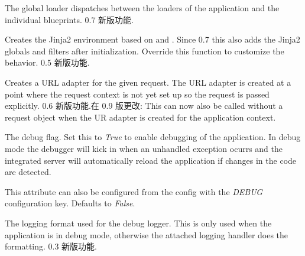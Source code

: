 \documentclass[a4paper,12pt]{sphinxmanual}
\begin{document}
\begin{fulllineitems}
\begin{fulllineitems}
The global loader dispatches between the loaders of the application
and the individual blueprints.
0.7 新版功能.
\end{fulllineitems}


\begin{fulllineitems}
\label{api:flask.Flask.create_jinja_environment}
Creates the Jinja2 environment based on {\hyperref[api:flask.Flask.jinja_options]{}}
and {\hyperref[api:flask.Flask.select_jinja_autoescape]{}}.  Since 0.7 this also adds
the Jinja2 globals and filters after initialization.  Override
this function to customize the behavior.
0.5 新版功能.
\end{fulllineitems}


\begin{fulllineitems}
\label{api:flask.Flask.create_url_adapter}
Creates a URL adapter for the given request.  The URL adapter
is created at a point where the request context is not yet set up
so the request is passed explicitly.
0.6 新版功能.在 0.9 版更改: This can now also be called without a request object when the
UR adapter is created for the application context.
\end{fulllineitems}


\begin{fulllineitems}
\label{api:flask.Flask.debug}
The debug flag.  Set this to \emph{True} to enable debugging of the
application.  In debug mode the debugger will kick in when an unhandled
exception ocurrs and the integrated server will automatically reload
the application if changes in the code are detected.

This attribute can also be configured from the config with the \emph{DEBUG}
configuration key.  Defaults to \emph{False}.

\end{fulllineitems}


\begin{fulllineitems}
\label{api:flask.Flask.debug_log_format}
The logging format used for the debug logger.  This is only used when
the application is in debug mode, otherwise the attached logging
handler does the formatting.
0.3 新版功能.
\end{fulllineitems}


\end{fulllineitems}
\end{document}
